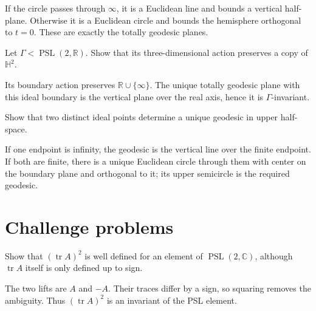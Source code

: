 \begin{solution}
If the circle passes through \(\infty\), it is a Euclidean line and bounds a vertical half-plane.  Otherwise it is a Euclidean circle and bounds the hemisphere orthogonal to \(t=0\).  These are exactly the totally geodesic planes.
\end{solution}

\begin{problem}\label{prob:vii36-11}
Let \(\Gamma<\operatorname{PSL}(2,\mathbb R)\).  Show that its three-dimensional action preserves a copy of \(\mathbb H^2\).
\end{problem}

\begin{solution}
Its boundary action preserves \(\mathbb R\cup\{\infty\}\).  The unique totally geodesic plane with this ideal boundary is the vertical plane over the real axis, hence it is \(\Gamma\)-invariant.
\end{solution}

\begin{problem}\label{prob:vii36-12}
Show that two distinct ideal points determine a unique geodesic in upper half-space.
\end{problem}

\begin{solution}
If one endpoint is infinity, the geodesic is the vertical line over the finite endpoint.  If both are finite, there is a unique Euclidean circle through them with center on the boundary plane and orthogonal to it; its upper semicircle is the required geodesic.
\end{solution}

\section{Challenge problems}

\begin{problem}\label{prob:vii36-ch01}
Show that \((\operatorname{tr}A)^2\) is well defined for an element of \(\operatorname{PSL}(2,\mathbb C)\), although \(\operatorname{tr}A\) itself is only defined up to sign.
\end{problem}

\begin{solution}
The two lifts are \(A\) and \(-A\).  Their traces differ by a sign, so squaring removes the ambiguity.  Thus \((\operatorname{tr}A)^2\) is an invariant of the PSL element.
\end{solution}

